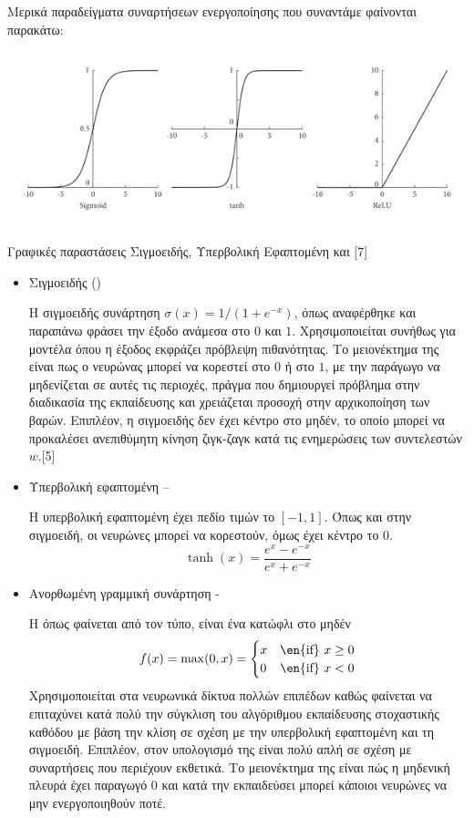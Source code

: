 Μερικά παραδείγματα συναρτήσεων ενεργοποίησης που συναντάμε φαίνονται παρακάτω:  
 \begin{Illustration}[!h] 
 \centering
\includegraphics[width=\textwidth]{images/image008.png} \caption{Γραφικές παραστάσεις Σιγμοειδής, Υπερβολική Εφαπτομένη και   [7]} 
\label{fig:activation-functions}
\end{Illustration}
\begin{itemize}
\item Σιγμοειδής ()

Η σιγμοειδής συνάρτηση $\sigma(x) ={1}/{(1 + e^{-x})}$, όπως αναφέρθηκε και παραπάνω φράσει την έξοδο ανάμεσα στο $0$ και $1$.  Χρησιμοποιείται συνήθως για μοντέλα όπου η έξοδος εκφράζει πρόβλεψη πιθανότητας. Το μειονέκτημα της  είναι πως ο νευρώνας μπορεί να κορεστεί στο $0$ ή στο $1$, με την παράγωγο να μηδενίζεται σε αυτές τις περιοχές, πράγμα που δημιουργεί πρόβλημα στην διαδικασία της εκπαίδευσης και χρειάζεται προσοχή στην αρχικοποίηση των βαρών. Επιπλέον, η σιγμοειδής δεν έχει κέντρο στο μηδέν, το οποίο μπορεί να προκαλέσει ανεπιθύμητη κίνηση ζιγκ-ζαγκ κατά τις ενημερώσεις των συντελεστών $w$.[5]
\item Υπερβολική εφαπτομένη –  

Η υπερβολική εφαπτομένη έχει πεδίο τιμών το $[-1,1]$. Όπως και στην σιγμοειδή, οι νευρώνες μπορεί να κορεστούν, όμως έχει κέντρο το $0$. 
\[
\tanh(x) = \frac{e^x - e^{-x}}{e^x + e^{-x}}
\]

\item Ανορθωμένη γραμμική συνάρτηση - 

Η  όπως φαίνεται από τον τύπο, είναι ένα κατώφλι στο μηδέν
\[
f(x) = \max(0, x) = 
\begin{cases} 
x & \text{\en{if} } x \geq 0 \\
0 & \text{\en{if} } x < 0 
\end{cases}
\]
Χρησιμοποιείται στα νευρωνικά δίκτυα πολλών επιπέδων καθώς φαίνεται να επιταχύνει κατά πολύ την σύγκλιση του αλγόριθμου εκπαίδευσης στοχαστικής καθόδου με βάση την κλίση  σε σχέση με την υπερβολική εφαπτομένη και τη σιγμοειδή. Επιπλέον, στον υπολογισμό της είναι πολύ απλή σε σχέση με συναρτήσεις που περιέχουν εκθετικά. Το μειονέκτημα της είναι πώς η μηδενική πλευρά έχει παραγωγό 0 και κατά την εκπαιδεύσει μπορεί κάποιοι νευρώνες να μην ενεργοποιηθούν ποτέ.
\end{itemize}

